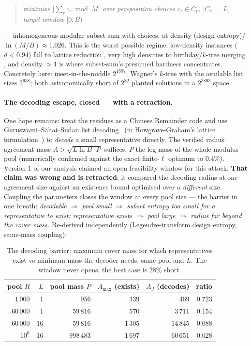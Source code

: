 \begin{quote}
\emph{minimise $\bigl|\sum_r c_r \bmod M\bigr|$ over per-position
choices $c_r\in C_r$, $|C_r|=L$, target window $[0,B)$}
\end{quote}

--- inhomogeneous modular subset-sum with choices, at density
(design entropy)/$\ln(M/B)\approx\mathbf{1.026}$. This is the worst
possible regime: low-density instances ($d<0.94$) fall to lattice
reduction \cite{LO,CJLOSS}, very high densities to birthday/$k$-tree
merging \cite{Wagner}, and density $\approx1$ is where subset-sum's
presumed hardness concentrates. Concretely here: meet-in-the-middle
$2^{1897}$; Wagner's $k$-tree with the available list sizes $2^{938}$;
both astronomically short of $2^{82}$ planted solutions in a
$2^{3893}$ space.

\paragraph{The decoding escape, closed --- with a retraction.} One
hope remains: treat the residues as a Chinese Remainder code and use
Guruswami--Sahai--Sudan list decoding~\cite{GSS} (in Howgrave-Graham's
lattice formulation~\cite{HG}) to \emph{decode} a small representative
directly. The verified radius: agreement mass $A>\sqrt{L\ln B\cdot P}$
suffices, $P$ the log-mass of the whole modulus pool (numerically
confirmed against the exact finite-$\ell$ optimum to $0.4\%$). Version
1 of our analysis claimed an open feasibility window for this attack.
\textbf{That claim was wrong and is retracted}: it compared the
decoding radius at one agreement size against an existence bound
optimised over a \emph{different} size. Coupling the parameters closes
the window at every pool size --- the barrier in one breath:
\emph{decodable $\Rightarrow$ pool small $\Rightarrow$ subset entropy
too small for a representative to exist; representative exists
$\Rightarrow$ pool large $\Rightarrow$ radius far beyond the cover
mass.} Re-derived independently (Legendre-transform design entropy,
same-mass coupling):

\begin{table}[h]
\centering\small
\caption{The decoding barrier: maximum cover mass for which
representatives exist vs minimum mass the decoder needs, same pool and
$L$. The window never opens; the best case is $28\%$ short.}
\label{tab:barrier}
\begin{tabular}{rrrrrr}
\toprule
pool $R$ & $L$ & pool mass $P$ & $A_{\max}$ (exists) & $A_J$ (decodes) & ratio\\
\midrule
$1\,000$ & 1 & 956 & 339 & 469 & 0.723\\
$60\,000$ & 1 & $59\,816$ & 570 & $3\,711$ & 0.154\\
$60\,000$ & 16 & $59\,816$ & $1\,305$ & $14\,845$ & 0.088\\
$10^6$ & 16 & $998\,483$ & $1\,697$ & $60\,651$ & 0.028\\
\bottomrule
\end{tabular}
\end{table}

